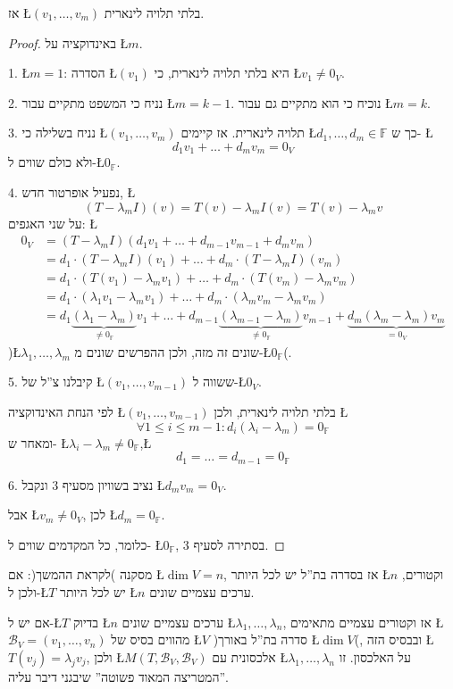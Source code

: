 \documentclass[english,hebrew]{article}
\theoremstyle{plain}
\begin{document}
אז \L{$(v_{1},\dots,v_{m})$} בלתי תלויה לינארית.
\begin{proof}
באינדוקציה על \L{$m$}.

1. \L{$m=1$}: הסדרה \L{$(v_{1})$} היא בלתי תלויה לינארית, כי \L{$v_{1}\neq0_{V}$}.

2. נניח כי המשפט מתקיים עבור \L{$m=k-1$}. נוכיח כי הוא מתקיים גם
עבור \L{$m=k$}.

3. נניח בשלילה כי \L{$(v_{1},\dots,v_{m})$} תלויה לינארית. אז קיימים
\L{$d_{1},\dots,d_{m}\in\mathbb{F}$} כך ש- \L{%
\[
d_{1}v_{1}+\dots+d_{m}v_{m}=0_{V}
\]
}%
ולא כולם שווים ל-\L{$0_{\mathbb{F}}$}.

4. נפעיל אופרטור חדש, \L{%
\[
\left(T-\lambda_{m}I\right)\left(v\right)=T(v)-\lambda_{m}I(v)=T(v)-\lambda_{m}v
\]
}%
על שני האגפים: \L{%
\begin{align*}
0_{V} & =(T-\lambda_{m}I)(d_{1}v_{1}+\dots+d_{m-1}v_{m-1}+d_{m}v_{m})\\
 & =d_{1}\cdot(T-\lambda_{m}I)(v_{1})+\dots+d_{m}\cdot(T-\lambda_{m}I)(v_{m})\\
 & =d_{1}\cdot\left(T(v_{1})-\lambda_{m}v_{1}\right)+\dots+d_{m}\cdot\left(T(v_{m})-\lambda_{m}v_{m}\right)\\
 & =d_{1}\cdot\left(\lambda_{1}v_{1}-\lambda_{m}v_{1}\right)+\dots+d_{m}\cdot\left(\lambda_{m}v_{m}-\lambda_{m}v_{m}\right)\\
 & =d_{1}\underset{\neq0_{\mathbb{F}}}{\underbrace{(\lambda_{1}-\lambda_{m})}}v_{1}+\dots+d_{m-1}\underset{\neq0_{\mathbb{F}}}{\underbrace{(\lambda_{m-1}-\lambda_{m})}}v_{m-1}+\underset{=0_{V}}{\underbrace{d_{m}(\lambda_{m}-\lambda_{m})v_{m}}}
\end{align*}
}%
)\L{$\lambda_{1},\dots,\lambda_{m}$} שונים זה מזה, ולכן ההפרשים שונים
מ-\L{$0_{\mathbb{F}}$}(.

5. קיבלנו צ\textquotedblright ל של \L{$(v_{1},\dots,v_{m-1})$} ששווה
ל-\L{$0_{V}$}.

לפי הנחת האינדוקציה \L{$(v_{1},\dots,v_{m-1})$} בלתי תלויה לינארית,
ולכן \L{%
\[
\forall1\le i\le m-1:d_{i}(\lambda_{i}-\lambda_{m})=0_{\mathbb{F}}
\]
}%
 ומאחר ש- \L{$\lambda_{i}-\lambda_{m}\neq0_{\mathbb{F}}$},\L{%
\[
d_{1}=\dots=d_{m-1}=0_{\mathbb{F}}
\]
}%

6. נציב בשוויון מסעיף 3 ונקבל \L{$d_{m}v_{m}=0_{V}$}.

אבל \L{$v_{m}\neq0_{V}$}, לכן \L{$d_{m}=0_{\mathbb{F}}$}.

כלומר, כל המקדמים שווים ל- \L{$0_{\mathbb{F}}$}, בסתירה לסעיף 3. 
\end{proof}
מסקנה )לקראת ההמשך(: אם \L{$\dim V=n$}, אז בסדרה בת\textquotedblright ל
יש לכל היותר \L{$n$} וקטורים, ולכן ל-\L{$T$} יש לכל היותר \L{$n$}
ערכים עצמיים שונים.

אם יש ל-\L{$T$} בדיוק \L{$n$} ערכים עצמיים שונים \L{$\lambda_{1},\dots,\lambda_{n}$},
אז וקטורים עצמיים מתאימים \L{$\mathcal{B}_{V}=(v_{1},\dots,v_{n})$}
מהווים בסיס של \L{$V$} )סדרה בת\textquotedblright ל באורך \L{$\dim V$}(,
ובבסיס הזה \L{$T(v_{j})=\lambda_{j}v_{j}$}, ולכן \L{$M(T,\mathcal{B}_{V},\mathcal{B}_{V})$}
אלכסונית עם \L{$\lambda_{1},\dots,\lambda_{n}$} על האלכסון. זו \textquotedblright המטריצה
המאוד פשוטה\textquotedblright{} שיבגני דיבר עליה.
\end{document}
